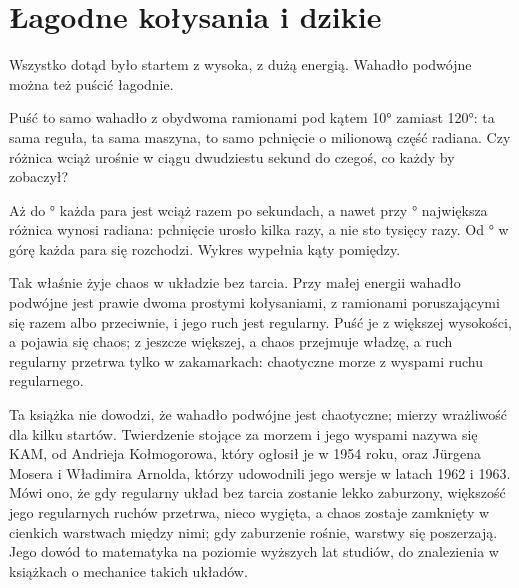 \section{Łagodne kołysania i dzikie}
\label{sec:ch13-islands}

\noindent
Wszystko dotąd było startem z wysoka, z dużą energią. Wahadło podwójne
można też puścić łagodnie.

\begin{think}
Puść to samo wahadło z obydwoma ramionami pod kątem 10° zamiast 120°: ta sama
reguła, ta sama maszyna, to samo pchnięcie o milionową część radiana. Czy
różnica wciąż urośnie w ciągu dwudziestu sekund do czegoś, co każdy by
zobaczył?
\end{think}



\noindent
Aż do ° każda para jest wciąż razem po
 sekundach, a nawet przy ° największa
różnica wynosi  radiana: pchnięcie urosło kilka razy, a
nie sto tysięcy razy. Od ° w górę każda para się
rozchodzi. Wykres wypełnia kąty pomiędzy.


\noindent
Tak właśnie żyje chaos w układzie bez tarcia. Przy małej energii wahadło
podwójne jest prawie dwoma prostymi kołysaniami, z ramionami poruszającymi
się razem albo przeciwnie, i jego ruch jest regularny. Puść je z większej
wysokości, a pojawia się chaos; z jeszcze większej, a chaos przejmuje władzę,
a ruch regularny przetrwa tylko w zakamarkach: chaotyczne morze z wyspami
ruchu regularnego.

\begin{rigourbox}
Ta książka nie dowodzi, że wahadło podwójne jest chaotyczne; mierzy
wrażliwość dla kilku startów. Twierdzenie stojące za morzem i jego wyspami
nazywa się KAM, od Andrieja Kołmogorowa, który ogłosił je w 1954 roku, oraz
Jürgena Mosera i Władimira Arnolda, którzy udowodnili jego wersje w latach
1962 i 1963. Mówi ono, że gdy regularny układ bez tarcia zostanie lekko
zaburzony, większość jego regularnych ruchów przetrwa, nieco wygięta, a chaos
zostaje zamknięty w cienkich warstwach między nimi; gdy zaburzenie rośnie,
warstwy się poszerzają. Jego dowód to matematyka na poziomie wyższych lat
studiów, do znalezienia w książkach o mechanice takich układów.
\end{rigourbox}

